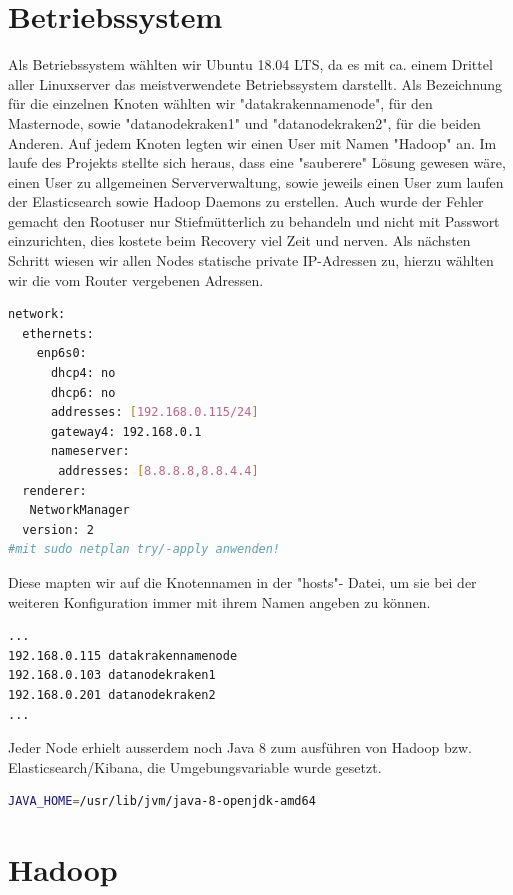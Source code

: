 \documentclass[12pt,twoside,a4paper,parskip]{scrbook}
\begin{document}
\section{Betriebssystem} Als Betriebssystem wählten wir Ubuntu 18.04 LTS, da es mit ca. einem Drittel aller Linuxserver das meistverwendete Betriebssystem darstellt. Als Bezeichnung für die einzelnen Knoten wählten wir "datakrakennamenode", für den Masternode, sowie "datanodekraken1" und "datanodekraken2", für die beiden Anderen. Auf jedem Knoten legten wir einen User mit Namen "Hadoop" an. Im laufe des Projekts stellte sich heraus, dass eine "sauberere" Lösung gewesen wäre, einen User zu allgemeinen Serververwaltung, sowie jeweils einen User zum laufen der Elasticsearch sowie Hadoop Daemons zu erstellen. Auch wurde der Fehler gemacht den Rootuser nur Stiefmütterlich zu behandeln und nicht mit Passwort einzurichten, dies kostete beim Recovery viel Zeit und nerven.\newline
Als nächsten Schritt wiesen wir allen Nodes statische private IP-Adressen zu, hierzu wählten wir die vom Router vergebenen Adressen. \pagebreak
\begin{lstlisting}[caption=datakrakennamenode: /etc/netplan/00-installer-config.yaml,label=hosts,language=bash]
network:
  ethernets:
    enp6s0:
      dhcp4: no
      dhcp6: no
      addresses: [192.168.0.115/24]
      gateway4: 192.168.0.1
      nameserver:
       addresses: [8.8.8.8,8.8.4.4]
  renderer:
   NetworkManager
  version: 2
#mit sudo netplan try/-apply anwenden!
\end{lstlisting}
Diese mapten wir auf die Knotennamen in der "hosts"- Datei, um sie bei der weiteren Konfiguration immer mit ihrem Namen angeben zu können.
\begin{lstlisting}[caption=etc/hosts,label=hosts,language=bash]
...
192.168.0.115 datakrakennamenode
192.168.0.103 datanodekraken1
192.168.0.201 datanodekraken2
...
\end{lstlisting}
Jeder Node erhielt ausserdem noch Java 8 zum ausführen von Hadoop bzw. Elasticsearch/Kibana, die Umgebungsvariable wurde gesetzt.
\begin{lstlisting}[caption=etc/environment,label=javaenv,language=bash]
JAVA_HOME=/usr/lib/jvm/java-8-openjdk-amd64
\end{lstlisting}

\section{Hadoop}
\end{document}
